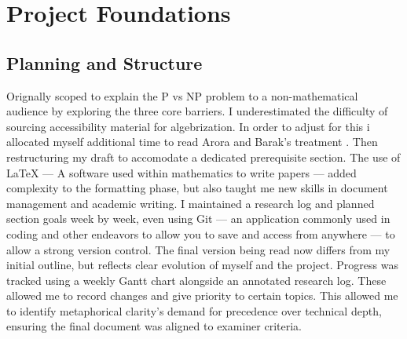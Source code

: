\documentclass[12pt]{report}
\begin{document}
\chapter*{Project Foundations}
\section*{Planning and Structure}
Orignally scoped to explain the P vs NP problem to a non-mathematical audience by exploring the three core barriers.
I underestimated the difficulty of sourcing accessibility material for algebrization.
In order to adjust for this i allocated myself additional time to read Arora and Barak's treatment \cite{arora2008algebrization}.
Then restructuring my draft to accomodate a dedicated prerequisite section.
The use of LaTeX --- A software used within mathematics to write papers --- added complexity to the formatting phase, but also taught me new skills in document management and academic writing.
I maintained a research log and planned section goals week by week, even using Git --- an application commonly used in coding and other endeavors to allow you to save and access from anywhere --- to allow a strong version control.
The final version being read now differs from my initial outline, but reflects clear evolution of myself and the project.
Progress was tracked using a weekly Gantt chart alongside an annotated research log.
These allowed me to record changes and give priority to certain topics.
This allowed me to identify metaphorical clarity's demand for precedence over technical depth, ensuring the final document was aligned to examiner criteria.
\end{document}
